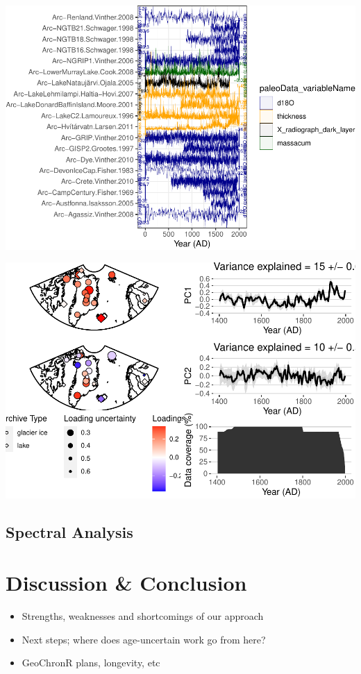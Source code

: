 \documentclass[gc, manuscript]{copernicus}
\begin{document}
\includegraphics{geoChronR-paper_files/figure-latex/unnamed-chunk-11-1.pdf}

\includegraphics{geoChronR-paper_files/figure-latex/unnamed-chunk-13-1.pdf}

\subsection{Spectral Analysis}

\section{Discussion \& Conclusion}

\begin{itemize}
\item
  Strengths, weaknesses and shortcomings of our approach
\item
  Next steps; where does age-uncertain work go from here?
\item
  GeoChronR plans, longevity, etc
\end{itemize}
\end{document}
